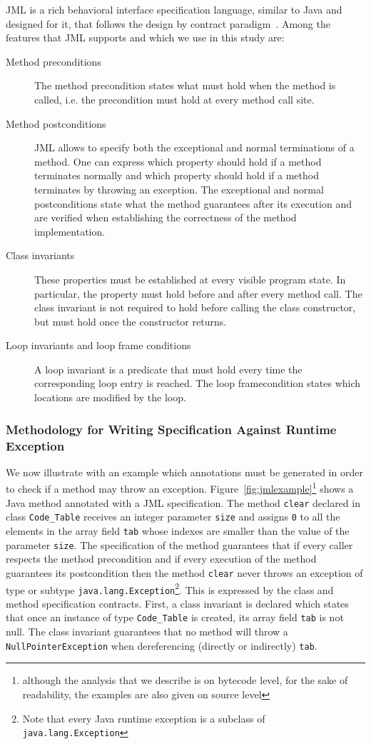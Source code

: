 JML is a rich behavioral interface specification language, similar to Java and designed for it, that follows the design by contract paradigm~\cite{M97oos}. Among the features that JML supports and which we use in this study are:
\begin{description}
\item[Method preconditions] The method precondition states what must hold when the method is called, i.e. the precondition must hold at every method call site.
\item[Method postconditions] JML allows to specify both the exceptional and normal terminations of a method. One can express which property should hold if a method terminates normally and which property should hold if a method terminates by throwing an exception. The exceptional and normal postconditions state what the method guarantees after its execution and are verified when establishing the correctness of the method implementation.
\item[Class invariants] These properties must be established at every visible program state. In particular, the property must hold before and after every method call. The class invariant is not required to hold before calling the class constructor, but must hold once the constructor returns.
\item[Loop invariants and loop frame conditions] A loop invariant is a predicate that must hold every time the corresponding loop entry is reached. The loop framecondition states which locations are modified by the loop.
\end{description}

\subsubsection{Methodology for Writing Specification Against Runtime Exception}

We now illustrate with an example which annotations must be generated in order to check if a method may throw an exception. Figure~\ref{fig:jmlexample}\footnote{although the analysis that we describe is on bytecode level, for the sake of readability, the examples are also given on source level} shows a Java method annotated with a JML specification. The method \verb!clear! declared in class \verb!Code_Table! receives an integer parameter \verb!size! and assigns \verb!0! to all the elements in the array field \verb!tab! whose indexes are smaller than the value of the parameter \verb!size!. The specification of the method guarantees that if every caller respects the method precondition and if every execution of the method guarantees its postcondition then the method \verb!clear! never throws an exception of type or subtype \verb!java.lang.Exception!\footnote{Note that every Java runtime exception is a subclass of \texttt{java.lang.Exception}}. This is expressed by the class and method specification contracts.
First, a class invariant is declared which states that once an instance of type \verb!Code_Table! is created, its array field \verb!tab! is not null. The class invariant guarantees that no method will throw a \verb!NullPointerException! when dereferencing (directly or indirectly) \verb!tab!.

